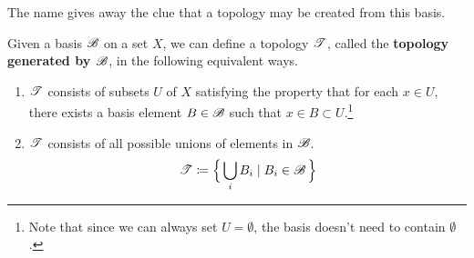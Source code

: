   The name gives away the clue that a topology may be created from this basis.  

  \begin{definition}
    \label{def:basis-to-topology}
    Given a basis $\operatorname{\mathscr{B}}$ on a set $X$, we can define a topology $\operatorname{\mathscr{T}}$, called the \textbf{topology generated by $\operatorname{\mathscr{B}}$}, in the following equivalent ways. 
    \begin{enumerate}
      \item $\operatorname{\mathscr{T}}$ consists of subsets $U$ of $X$ satisfying the property that for each $x \in U$, there exists a basis element $B \in \operatorname{\mathscr{B}}$ such that $x \in B \subset U$.\footnote{Note that since we can always set $U = \emptyset$, the basis doesn't need to contain $\emptyset$. }
      \begin{center}
      \end{center}

      \item $\operatorname{\mathscr{T}}$ consists of all possible unions of elements in $\operatorname{\mathscr{B}}$. 
      \begin{equation}
        \operatorname{\mathscr{T}} \coloneqq \Big\{ \bigcup_i B_i \mid B_i \in \operatorname{\mathscr{B}}\Big\}
      \end{equation}
    \end{enumerate}
  \end{definition} 
